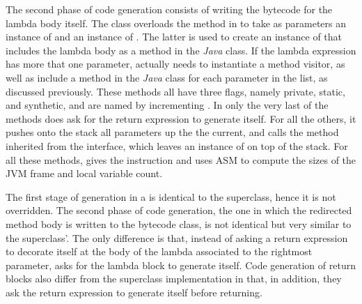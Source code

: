 The second phase of code generation consists of writing the bytecode for the lambda body itself. The  class overloads the  method in  to take as parameters an instance of  and an instance of . The latter is used to create an instance of  that includes the lambda body as a method in the \emph{Java} class. If the lambda expression has more that one parameter,  actually needs to instantiate a method visitor, as well as include a method in the \emph{Java} class for each parameter in the list, as discussed previously. These methods all have three flags, namely private, static, and synthetic, and are named by incrementing . In only the very last of the methods does  ask for the return expression to generate itself. For all the others, it pushes onto the stack all parameters up the the current, and calls the  method inherited from the  interface, which leaves an instance of  on top of the stack. For all these methods,  gives the  instruction and uses ASM to compute the sizes of the JVM frame and local variable count.

The first stage of generation in a  is identical to the  superclass, hence it is not overridden. The second phase of code generation, the one in which the redirected method body is written to the bytecode class, is not identical but very similar to the superclass'. The only difference is that, instead of asking a return expression to decorate itself at the body of the lambda associated to the rightmost parameter,  asks for the lambda block to generate itself. Code generation of return blocks also differ from the superclass implementation in that, in addition, they ask the return expression to generate itself before returning.

